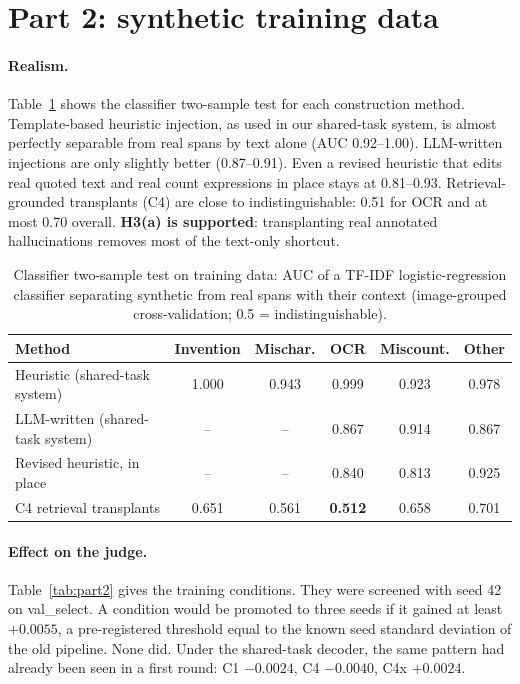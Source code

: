 \section{Part 2: synthetic training data}\label{sec:exp-synth}

\paragraph{Realism.}
Table~\ref{tab:c2st} shows the classifier two-sample test for each construction method. Template-based heuristic injection, as used in our shared-task system, is almost perfectly separable from real spans by text alone (AUC 0.92--1.00). LLM-written injections are only slightly better (0.87--0.91). Even a revised heuristic that edits real quoted text and real count expressions in place stays at 0.81--0.93. Retrieval-grounded transplants (C4) are close to indistinguishable: 0.51 for OCR and at most 0.70 overall. \textbf{H3(a) is supported}: transplanting real annotated hallucinations removes most of the text-only shortcut.

\begin{table}[!htb]
    \centering
    \caption{Classifier two-sample test on training data: AUC of a TF-IDF logistic-regression classifier separating synthetic from real spans with their context (image-grouped cross-validation; 0.5 = indistinguishable).}
    \label{tab:c2st}
    \begin{tabular}{lccccc}
    \toprule
    Method & Invention & Mischar. & OCR & Miscount. & Other \\
    \midrule
    Heuristic (shared-task system) & 1.000 & 0.943 & 0.999 & 0.923 & 0.978 \\
    LLM-written (shared-task system) & -- & -- & 0.867 & 0.914 & 0.867 \\
    Revised heuristic, in place & -- & -- & 0.840 & 0.813 & 0.925 \\
    C4 retrieval transplants & 0.651 & 0.561 & \textbf{0.512} & 0.658 & 0.701 \\
    \bottomrule
    \end{tabular}
\end{table}

\paragraph{Effect on the judge.}
Table~\ref{tab:part2} gives the training conditions. They were screened with seed 42 on val\_select. A condition would be promoted to three seeds if it gained at least $+0.0055$, a pre-registered threshold equal to the known seed standard deviation of the old pipeline. None did. Under the shared-task decoder, the same pattern had already been seen in a first round: C1 $-0.0024$, C4 $-0.0040$, C4x $+0.0024$.


